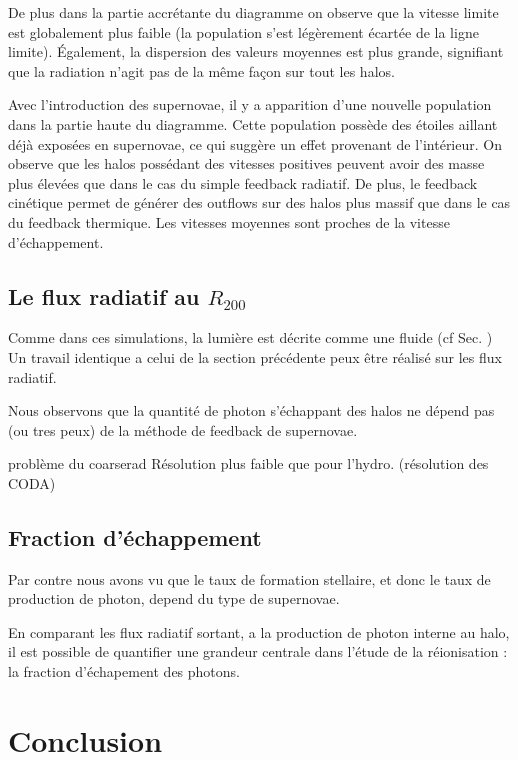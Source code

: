 De plus dans la partie accrétante du diagramme on observe que la vitesse limite est globalement plus faible (la population s'est légèrement écartée de la ligne limite).
Également, la dispersion des valeurs moyennes est plus grande, signifiant que la radiation n'agit pas de la même façon sur tout les halos.

Avec l'introduction des supernovae, il y a apparition d'une nouvelle population dans la partie haute du diagramme.
Cette population possède des étoiles aillant déjà exposées en supernovae, ce qui suggère un effet provenant de l'intérieur.
On observe que les halos possédant des vitesses positives peuvent avoir des masse plus élevées que dans le cas du simple feedback radiatif.
De plus, le feedback cinétique permet de générer des outflows sur des halos plus massif que dans le cas du feedback thermique.
Les vitesses moyennes sont proches de la vitesse d'échappement.

\subsection{Le flux radiatif au $R_{200}$}

Comme dans ces simulations, la lumière est décrite comme une fluide (cf Sec. ) %
Un travail identique a celui de la section précédente peux être réalisé sur les flux radiatif.

Nous observons que la quantité de photon s'échappant des halos ne dépend pas (ou tres peux) de la méthode de feedback de supernovae.

problème du coarserad %
Résolution plus faible que pour l'hydro.
(résolution des CODA)




\subsection{Fraction d'échappement}


Par contre nous avons vu que le taux de formation stellaire, et donc le taux de production de photon, depend du type de supernovae.

En comparant les flux radiatif sortant, a la production de photon interne au halo, il est possible de quantifier une grandeur centrale dans l'étude de la réionisation : la fraction d'échapement des photons.




\section{Conclusion}


